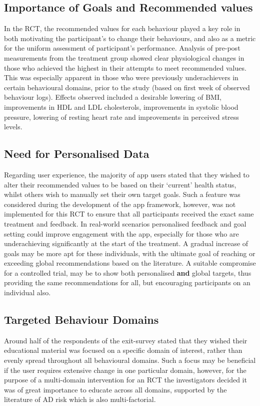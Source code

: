\subsection{Importance of Goals and Recommended values}
In the RCT, the recommended values for each behaviour played a key role in both motivating the participant's to change their behaviours, and also as a metric for the uniform assessment of participant's performance. Analysis of pre-post measurements from the treatment group showed clear physiological changes in those who achieved the highest in their attempts to meet recommended values. This was especially apparent in those who were previously underachievers in certain behavioural domains, prior to the study (based on first week of observed behaviour logs). Effects observed included a desirable lowering of BMI, improvements in HDL and LDL cholesterols, improvements in systolic blood pressure, lowering of resting heart rate and improvements in perceived stress levels.

\subsection{Need for Personalised Data} \label{subsection: finding-need-personalised}
Regarding user experience, the majority of app users stated that they wished to alter their recommended values to be based on their ‘current’ health status, whilst others wish to manually set their own target goals. Such a feature was considered during the development of the app framework, however, was not implemented for this RCT to ensure that all participants received the exact same treatment and feedback.
In real-world scenarios personalised feedback and goal setting  could improve engagement with the app, especially for those who are underachieving significantly at the start of the treatment. A gradual increase of goals may be more apt for these individuals, with the ultimate goal of reaching or exceeding global recommendations based on the literature.
A suitable compromise for a controlled trial, may be to show both personalised \textbf{and} global targets, thus providing the same recommendations for all, but encouraging participants on an individual also.

\subsection{Targeted Behaviour Domains}
Around half of the respondents of the exit-survey stated that they wished  their educational material was focused on a specific domain of interest, rather than evenly spread throughout all behavioural domains. Such a focus may be beneficial if the user requires extensive change in one particular domain, however, for the purpose of a multi-domain intervention for an RCT the investigators decided it was of great importance to educate across all domains, supported by the literature of AD risk which is also multi-factorial.

